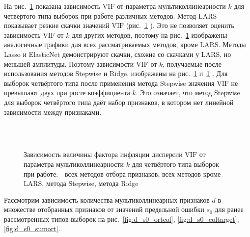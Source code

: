 \documentclass[a4paper,12pt]{article}
\newcommand{\vif}{\mathrm{VIF}}
\theoremstyle{plain}
\begin{document}
На рис.~\ref{fig:Vif_k_sumort} показана зависимость $\vif$ от параметра мультиколлинеарности $k$ для четвёртого типа выборок при работе различных методов. Метод LARS показывает резкие скачки значений $\vif$ (рис.~\ref{fig:Vif_k_sumort} ). Это не позволяет оценить зависимость $\vif$ от $k$ для других методов, поэтому на рис.~\ref{fig:Vif_k_sumort}  изображены аналогичные графики для всех рассматриваемых методов, кроме LARS. Методы Lasso и ElasticNet демонстрируют скачки, схожие со скачками у LARS, но меньшей амплитуды. Поэтому зависимости $\vif$ от $k$, получаемые после использования методов Stepwise и Ridge, изображены на рис.~\ref{fig:Vif_k_sumort}   и~\ref{fig:Vif_k_sumort} . Для выборок четвёртого типа после применения метода Stepwise значения $\vif$ не превышают двух при росте коэффициента $k$. Это означает, что метод Stepwise для выборок четвёртого типа даёт набор признаков, в котором нет линейной зависимости между признаками.   

\begin{figure}[!h]
\centering
{}
~
\\
~
\caption{Зависимость величины фактора инфляции дисперсии $\vif$ от параметра мультиколлинеарности $k$ для четвёртого типа выборок при работе:~~всех методов отбора признаков,  всех методов кроме LARS,  метода Stepwise,  метода Ridge }
\label{fig:Vif_k_sumort}
\end{figure} 


Рассмотрим зависимость количества мультиколлинеарных признаков $d$ в множестве отобранных признаков от значений предельной ошибки $s_0$ для ранее рассмотренных типов выборок на рис.~\ref{fig:d_s0_ortcol}, \ref{fig:d_s0_coltarget}, \ref{fig:d_s0_sumort}. 
\end{document}

